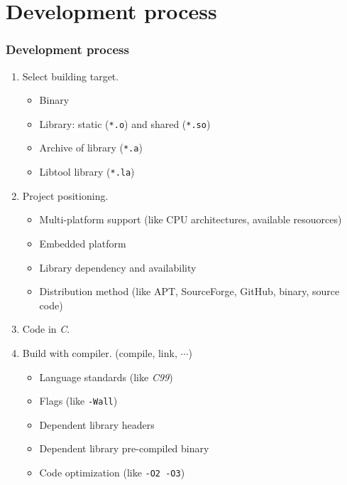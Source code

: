 \section{Development process}

\begin{frame}
    \frametitle{Development process}

    \begin{enumerate}
        \item \footnotesize Select building target.
            \begin{itemize}
                \item \scriptsize Binary
                \item \scriptsize Library: static (\texttt{*.o}) and shared (\texttt{*.so})
                \item \scriptsize Archive of library (\texttt{*.a})
                \item \scriptsize Libtool library (\texttt{*.la})
            \end{itemize}
        \item \footnotesize Project positioning.
            \begin{itemize}
                \item \scriptsize Multi-platform support (like CPU architectures, available resouorces)
                \item \scriptsize Embedded platform
                \item \scriptsize Library dependency and availability
                \item \scriptsize Distribution method (like APT, SourceForge, GitHub, binary, source code)
            \end{itemize}
        \item \footnotesize Code in \textit{C}.
        \item \footnotesize Build with compiler. (compile, link, $\cdots$)
            \begin{itemize}
                \item \scriptsize Language standards (like \textit{C99})
                \item \scriptsize Flags (like \texttt{-Wall})
                \item \scriptsize Dependent library headers
                \item \scriptsize Dependent library pre-compiled binary
                \item \scriptsize Code optimization (like \texttt{-O2 -O3})

\end{itemize}
\end{enumerate}
\end{frame}
